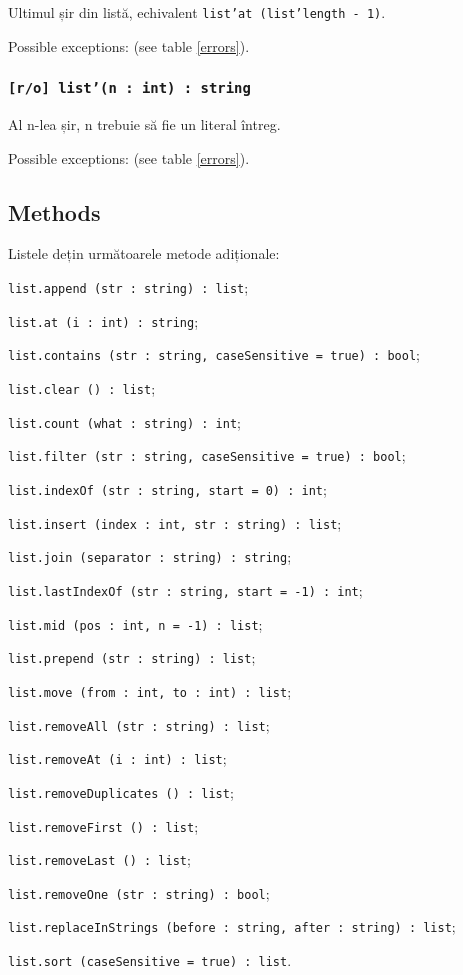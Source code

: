 Ultimul șir din listă, echivalent \texttt{list'at (list'length - 1)}.

Possible exceptions:  (see table \ref{errors}).

\subsubsection{\texttt{[r/o] list'(n : int) : string}}

Al n-lea șir, n trebuie să fie un literal întreg.

Possible exceptions:  (see table \ref{errors}).

\subsection{Methods}

Listele dețin următoarele metode adiționale:
\begin{icItems}
\item \texttt{list.append (str : string) : list};
\item \texttt{list.at (i : int) : string};
\item \texttt{list.contains (str : string, caseSensitive = true) : bool};
\item \texttt{list.clear () : list};
\item \texttt{list.count (what : string) : int};
\item \texttt{list.filter (str : string, caseSensitive = true) : bool};
\item \texttt{list.indexOf (str : string, start = 0) : int};
\item \texttt{list.insert (index : int, str : string) : list};
\item \texttt{list.join (separator : string) : string};
\item \texttt{list.lastIndexOf (str : string, start = -1) : int};
\item \texttt{list.mid (pos : int, n = -1) : list};
\item \texttt{list.prepend (str : string) : list};
\item \texttt{list.move (from : int, to : int) : list};
\item \texttt{list.removeAll (str : string) : list};
\item \texttt{list.removeAt (i : int) : list};
\item \texttt{list.removeDuplicates () : list};
\item \texttt{list.removeFirst () : list};
\item \texttt{list.removeLast () : list};
\item \texttt{list.removeOne (str : string) : bool};
\item \texttt{list.replaceInStrings (before : string, after : string) : list};
\item \texttt{list.sort (caseSensitive = true) : list}.
\end{icItems}

